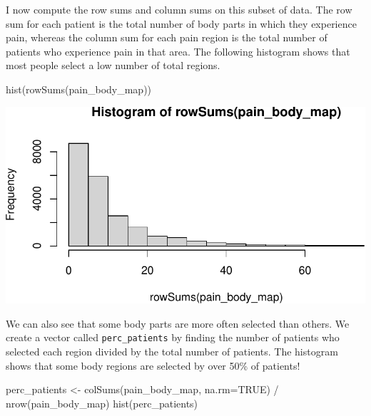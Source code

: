 \documentclass[
  letterpaper,
]{latex/krantz}
\makeatletter
\newenvironment{Shaded}{\begin{snugshade}}{\end{snugshade}}
\newcommand{\AttributeTok}[1]{\textcolor[rgb]{0.40,0.45,0.13}{#1}}
\newcommand{\ConstantTok}[1]{\textcolor[rgb]{0.56,0.35,0.01}{#1}}
\newcommand{\FunctionTok}[1]{\textcolor[rgb]{0.28,0.35,0.67}{#1}}
\newcommand{\NormalTok}[1]{\textcolor[rgb]{0.00,0.23,0.31}{#1}}
\newcommand{\OtherTok}[1]{\textcolor[rgb]{0.00,0.23,0.31}{#1}}
\newcommand{\SpecialCharTok}[1]{\textcolor[rgb]{0.37,0.37,0.37}{#1}}
\newenvironment{kframe}{%
\medskip{}
\setlength{\fboxsep}{.8em}
 \def\at@end@of@kframe{}%
 \ifinner\ifhmode%
  \def\at@end@of@kframe{\end{minipage}}%
  \begin{minipage}{\columnwidth}%
 \fi\fi%
 \def\FrameCommand##1{\hskip\@totalleftmargin \hskip-\fboxsep
 \colorbox{shadecolor}{##1}\hskip-\fboxsep
     \hskip-\linewidth \hskip-\@totalleftmargin \hskip\columnwidth}%
 \MakeFramed {\advance\hsize-\width
   \@totalleftmargin\z@ \linewidth\hsize
   \@setminipage}}%
 {\par\unskip\endMakeFramed%
 \at@end@of@kframe}
\renewenvironment{Shaded}{\begin{kframe}}{\end{kframe}}
\makeatother
\begin{document}
I now compute the row sums and column sums on this subset of data. The
row sum for each patient is the total number of body parts in which they
experience pain, whereas the column sum for each pain region is the
total number of patients who experience pain in that area. The following
histogram shows that most people select a low number of total regions.

\begin{Shaded}
\begin{Highlighting}[]
\FunctionTok{hist}\NormalTok{(}\FunctionTok{rowSums}\NormalTok{(pain\_body\_map))}
\end{Highlighting}
\end{Shaded}

\begin{center}
\includegraphics[width=1\textwidth,height=\textheight]{book/working_data_files_files/figure-pdf/unnamed-chunk-20-1.pdf}
\end{center}

We can also see that some body parts are more often selected than
others. We create a vector called \texttt{perc\_patients} by finding the
number of patients who selected each region divided by the total number
of patients. The histogram shows that some body regions are selected by
over 50\% of patients!

\begin{Shaded}
\begin{Highlighting}[]
\NormalTok{perc\_patients }\OtherTok{\textless{}{-}} \FunctionTok{colSums}\NormalTok{(pain\_body\_map, }\AttributeTok{na.rm=}\ConstantTok{TRUE}\NormalTok{) }\SpecialCharTok{/}
  \FunctionTok{nrow}\NormalTok{(pain\_body\_map)}
\FunctionTok{hist}\NormalTok{(perc\_patients)}
\end{Highlighting}
\end{Shaded}
\end{document}
